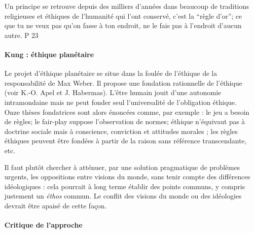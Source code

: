 \begin{singlequote}
    Un principe se retrouve depuis des milliers d’années dans beaucoup de traditions religieuses et éthiques de l’humanité qui l’ont conservé, c’est la “règle d’or”; ce que tu ne veux pas qu’on fasse à ton endroit, ne le fais pas à l’endroit d’aucun autre. \cite{kuschel_manifeste_1995} P 23
\end{singlequote}


\label{Comment:MemoireISTR2}




 \paragraph{Kung : éthique planétaire}
 \cite{kung_lethique_2009}

\begin{singlequote}
Le projet d’éthique planétaire se situe dans la foulée de l’éthique de la responsabilité de Max Weber. Il propose une fondation rationnelle de l’éthique (voir K.-O. Apel et J. Habermas). L’être humain jouit d’une autonomie intramondaine mais ne peut fonder seul l’universalité de l’obligation éthique. Onze thèses fondatrices sont alors énoncées comme, par exemple : le jeu a besoin de règles; le fair-play suppose l’observation de normes; éthique n’équivaut pas à doctrine sociale mais à conscience, conviction et attitudes morales ; les règles éthiques peuvent être fondées à partir de la raison sans référence transcendante, etc.
\end{singlequote}

\label{Comment:MemoireISTR3}



\begin{singlequote}
            Il faut plutôt chercher à atténuer, par une solution pragmatique de problèmes urgents, les oppositions entre visions du monde, sans tenir compte des différences idéologiques : cela pourrait à long terme établir des points communs, y compris justement un \textit{éthos} commun. Le conflit des visions du monde ou des idéologies devrait être apaisé de cette façon. \cite{kung_lethique_2009}
\end{singlequote}

\paragraph{Critique de l'approche} 


